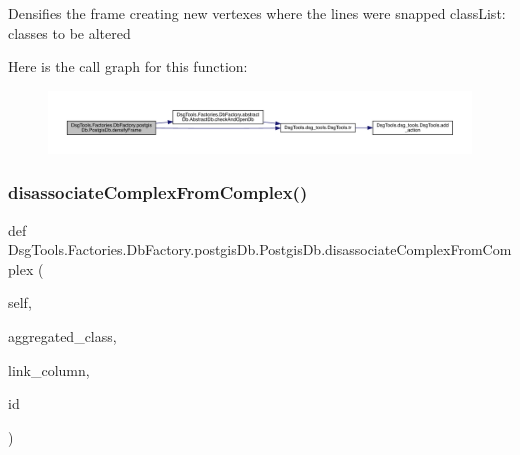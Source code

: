 \begin{DoxyVerb}Densifies the frame creating new vertexes where the lines were snapped
classList: classes to be altered
\end{DoxyVerb}
 Here is the call graph for this function\+:
\nopagebreak
\begin{figure}[H]
\begin{center}
\leavevmode
\includegraphics[width=350pt]{class_dsg_tools_1_1_factories_1_1_db_factory_1_1postgis_db_1_1_postgis_db_a26155c70bff315e00e48b4b5dc21137c_cgraph}
\end{center}
\end{figure}
\mbox{\label{class_dsg_tools_1_1_factories_1_1_db_factory_1_1postgis_db_1_1_postgis_db_ae4430782ffd26a5abaf3ba2ca8fd96c5}} 
\subsubsection{\texorpdfstring{disassociate\+Complex\+From\+Complex()}{disassociateComplexFromComplex()}}
{\footnotesize\ttfamily def Dsg\+Tools.\+Factories.\+Db\+Factory.\+postgis\+Db.\+Postgis\+Db.\+disassociate\+Complex\+From\+Complex (\begin{DoxyParamCaption}\item[{}]{self,  }\item[{}]{aggregated\+\_\+class,  }\item[{}]{link\+\_\+column,  }\item[{}]{id }\end{DoxyParamCaption})}

